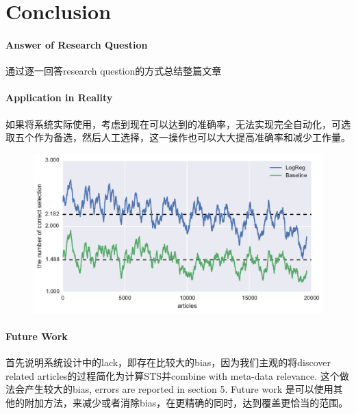 \section{Conclusion}

\paragraph{Answer of Research Question}
通过逐一回答research question的方式总结整篇文章

\paragraph{Application in Reality}
如果将系统实际使用，考虑到现在可以达到的准确率，无法实现完全自动化，可选取五个作为备选，然后人工选择，这一操作也可以大大提高准确率和减少工作量。

\begin{figure}[!htb]
    \centering
    \includegraphics[width=\textwidth]{fig/precision_inc_supervised_5}
    \caption[]{}
    \label{fig:top5}
\end{figure}

\paragraph{Future Work}
首先说明系统设计中的lack，即存在比较大的bias，因为我们主观的将discover related articles的过程简化为计算STS并combine with meta-data relevance. 这个做法会产生较大的bias, errors are reported in section 5. Future work 是可以使用其他的附加方法，来减少或者消除bias，在更精确的同时，达到覆盖更恰当的范围。
